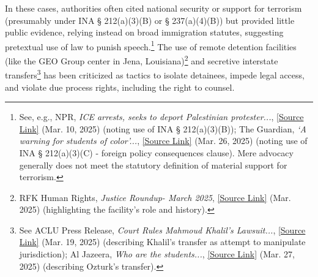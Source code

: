 \documentclass[11pt, letterpaper]{article}
\begin{document}
In these cases, authorities often cited national security or support for terrorism (presumably under INA § 212(a)(3)(B) or § 237(a)(4)(B)) but provided little public evidence, relying instead on broad immigration statutes, suggesting pretextual use of law to punish speech.\footnote{See, e.g., NPR, \emph{ICE arrests, seeks to deport Palestinian protester...}, \href{https://www.npr.org/2025/03/10/nx-s1-5323166/arrest-green-card-palestinian-protest\#:~:text=The\%20arrest\%20follows\%20through\%20on,endorses\%20or\%20espouses\%20terrorist\%20activity}{[Source Link]} (Mar. 10, 2025) (noting use of INA § 212(a)(3)(B)); The Guardian, \emph{‘A warning for students of color’...}, \href{https://www.theguardian.com/us-news/2025/mar/26/us-universities-students-israel-palestine-protests\#:~:text=In\%20the\%20case\%20of\%20Khalil,promoting\%20antisemitism\%20on\%20social\%20media\%E2\%80\%9D}{[Source Link]} (Mar. 26, 2025) (noting use of INA § 212(a)(3)(C) - foreign policy consequences clause). Mere advocacy generally does not meet the statutory definition of material support for terrorism.} The use of remote detention facilities (like the GEO Group center in Jena, Louisiana)\footnote{RFK Human Rights, \emph{Justice Roundup- March 2025}, \href{https://www.linkedin.com/pulse/justice-roundup-march-2025-rfkhumanrights-glnxe\#:~:text=The\%20Central\%20Louisiana\%20ICE\%20Processing,light\%20on\%20egregious\%20human\%20rights}{[Source Link]} (Mar. 2025) (highlighting the facility's role and history).} and secretive interstate transfers\footnote{See ACLU Press Release, \emph{Court Rules Mahmoud Khalil’s Lawsuit...}, \href{https://www.aclu.org/press-releases/court-rules-mahmoud-khalils-lawsuit-challenging-his-unlawful-detention-by-ice-should-move-forward-in-new-jersey\#:~:text=Mr,rewarding\%20the\%20Trump\%20administration\%E2\%80\%99s\%20unlawful}{[Source Link]} (Mar. 19, 2025) (describing Khalil's transfer as attempt to manipulate jurisdiction); Al Jazeera, \emph{Who are the students...}, \href{https://www.aljazeera.com/news/2025/3/27/who-are-the-students-trump-wants-to-deport\#:~:text=Ozturk\%E2\%80\%99s\%20lawyer\%2C\%20Mahsa\%20Khanbabai\%2C\%20filed,Massachusetts\%20without\%2048\%20hours\%20notice}{[Source Link]} (Mar. 27, 2025) (describing Ozturk's transfer).} has been criticized as tactics to isolate detainees, impede legal access, and violate due process rights, including the right to counsel.
\end{document}
